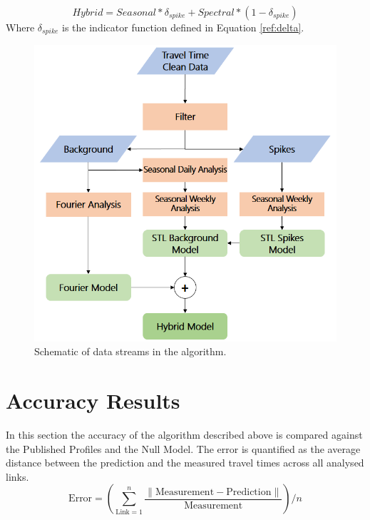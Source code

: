 \documentclass[conference]{IEEEtran}
\begin{document}
\begin{equation}
Hybrid = Seasonal * \delta_{spike} + Spectral * (1 - \delta_{spike})
\end{equation}
Where $\delta_{spike}$ is the indicator function defined in Equation \ref{ref:delta}.
\begin{figure}[htbp]
	\centering
	\includegraphics[width=0.95\linewidth]{new_flow.png}
	\caption{Schematic of data streams in the algorithm.}
	\label{fig:flowchart}
\end{figure}


\section{Accuracy Results}
In this section the accuracy of the algorithm described above is compared against the Published Profiles and the Null Model. The error is quantified as the average distance between the prediction and the measured travel times across all analysed links.
\begin{equation}
\textrm{Error} = \left( \sum_{\textrm{Link}=1}^{n} \frac{\|\textrm{Measurement} - \textrm{Prediction}\|}{\textrm{Measurement}}\right) /n 
\end{equation}
\end{document}
